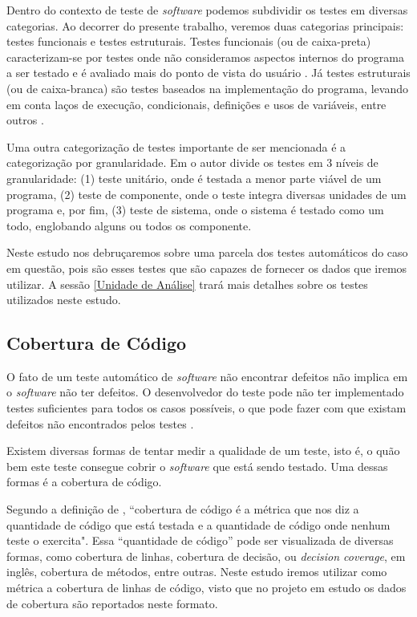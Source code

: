 \documentclass[11.5pt]{article}
\begin{document}
Dentro do contexto de teste de \textit{software} podemos subdividir os testes em diversas
categorias. Ao decorrer do presente trabalho, veremos duas categorias principais: testes funcionais
e testes estruturais.
Testes funcionais (ou de caixa-preta) caracterizam-se por testes onde não consideramos aspectos
internos do programa a ser testado e é avaliado mais do ponto de vista do usuário \cite{introTeste}.
Já testes estruturais (ou de caixa-branca) são testes baseados na implementação do programa, levando
em conta laços de execução, condicionais, definições e usos de variáveis, entre outros
\cite{introTeste}.

Uma outra categorização de testes importante de ser mencionada é a categorização por granularidade.
Em \cite{engSwSommerville} o autor divide os testes em 3 níveis de granularidade:
(1) teste unitário, onde é testada a menor parte viável de um programa,
(2) teste de componente, onde o teste integra diversas unidades de um programa e, por fim,
(3) teste de sistema, onde o sistema é testado como um todo, englobando alguns ou todos os
componente.



Neste estudo nos debruçaremos sobre uma parcela dos testes automáticos do caso em questão, pois são
esses testes que são capazes de fornecer os dados que iremos utilizar. A sessão
\ref{Unidade de Análise} trará mais detalhes sobre os testes utilizados neste estudo.



\subsection{Cobertura de Código}

O fato de um teste automático de \textit{software} não encontrar defeitos não implica em o
\textit{software} não ter defeitos.
O desenvolvedor do teste pode não ter implementado testes suficientes para todos os casos possíveis,
o que pode fazer com que existam defeitos não encontrados pelos testes \cite{engSwSommerville}.

Existem diversas formas de tentar medir a qualidade de um teste, isto é, o quão bem este teste
consegue cobrir o \textit{software} que está sendo testado.
Uma dessas formas é a cobertura de código.

Segundo a definição de \cite{tddBook}, ``cobertura de código é a métrica que nos diz a quantidade de
código que está testada e a quantidade de código onde nenhum teste o exercita".
Essa ``quantidade de código'' pode ser visualizada de diversas formas, como cobertura de linhas,
cobertura de decisão, ou \textit{decision coverage}, em inglês, cobertura de métodos, entre outras.
Neste estudo iremos utilizar como métrica a cobertura de linhas de código, visto que no projeto em
estudo os dados de cobertura são reportados neste formato.
\end{document}

